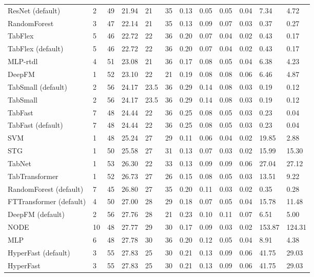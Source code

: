 \begin{tabular}{lllllrllllll}
ResNet (default) & 2 & 49 & 21.94 & 21 & 35 & 0.13 & 0.05 & 0.05 & 0.04 & 7.34 & 4.72 \\
RandomForest & 3 & 47 & 22.14 & 21 & 35 & 0.13 & 0.09 & 0.07 & 0.03 & 0.37 & 0.27 \\
TabFlex & 5 & 46 & 22.72 & 22 & 36 & 0.20 & 0.07 & 0.04 & 0.02 & 0.43 & 0.17 \\
TabFlex (default) & 5 & 46 & 22.72 & 22 & 36 & 0.20 & 0.07 & 0.04 & 0.02 & 0.43 & 0.17 \\
MLP-rtdl & 4 & 51 & 23.08 & 21 & 36 & 0.17 & 0.08 & 0.05 & 0.04 & 6.38 & 4.23 \\
DeepFM & 1 & 52 & 23.10 & 22 & 21 & 0.19 & 0.08 & 0.08 & 0.06 & 6.46 & 4.87 \\
TabSmall (default) & 2 & 56 & 24.17 & 23.5 & 36 & 0.29 & 0.14 & 0.08 & 0.03 & 0.19 & 0.12 \\
TabSmall & 2 & 56 & 24.17 & 23.5 & 36 & 0.29 & 0.14 & 0.08 & 0.03 & 0.19 & 0.12 \\
TabFast & 7 & 48 & 24.44 & 22 & 36 & 0.25 & 0.08 & 0.05 & 0.03 & 0.23 & 0.04 \\
TabFast (default) & 7 & 48 & 24.44 & 22 & 36 & 0.25 & 0.08 & 0.05 & 0.03 & 0.23 & 0.04 \\
SVM & 1 & 48 & 25.24 & 27 & 29 & 0.11 & 0.06 & 0.04 & 0.02 & 19.85 & 2.88 \\
STG & 1 & 50 & 25.58 & 27 & 31 & 0.13 & 0.07 & 0.03 & 0.02 & 15.99 & 15.30 \\
TabNet & 1 & 53 & 26.30 & 22 & 33 & 0.13 & 0.09 & 0.09 & 0.06 & 27.04 & 27.12 \\
TabTransformer & 1 & 52 & 26.73 & 27 & 26 & 0.15 & 0.08 & 0.05 & 0.03 & 13.51 & 9.22 \\
RandomForest (default) & 7 & 45 & 26.80 & 27 & 35 & 0.20 & 0.11 & 0.03 & 0.02 & 0.35 & 0.28 \\
FTTransformer (default) & 4 & 50 & 27.00 & 28 & 29 & 0.18 & 0.07 & 0.05 & 0.04 & 15.78 & 11.48 \\
DeepFM (default) & 2 & 56 & 27.76 & 28 & 21 & 0.23 & 0.10 & 0.11 & 0.07 & 6.51 & 5.00 \\
NODE & 10 & 48 & 27.77 & 29 & 30 & 0.17 & 0.09 & 0.03 & 0.02 & 153.87 & 124.31 \\
MLP & 6 & 48 & 27.78 & 30 & 36 & 0.20 & 0.12 & 0.05 & 0.04 & 8.91 & 4.38 \\
HyperFast (default) & 3 & 55 & 27.83 & 25 & 30 & 0.21 & 0.13 & 0.09 & 0.06 & 41.75 & 29.03 \\
HyperFast & 3 & 55 & 27.83 & 25 & 30 & 0.21 & 0.13 & 0.09 & 0.06 & 41.75 & 29.03 \\

\end{tabular}
